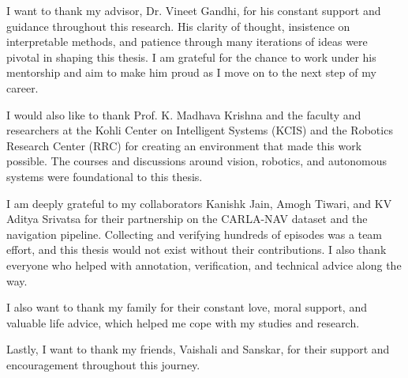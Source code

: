 I want to thank my advisor, Dr. Vineet Gandhi, for his constant support and guidance throughout this research. His clarity of thought, insistence on interpretable methods, and patience through many iterations of ideas were pivotal in shaping this thesis. I am grateful for the chance to work under his mentorship and aim to make him proud as I move on to the next step of my career.

I would also like to thank Prof. K. Madhava Krishna and the faculty and researchers at the Kohli Center on Intelligent Systems (KCIS) and the Robotics Research Center (RRC) for creating an environment that made this work possible. The courses and discussions around vision, robotics, and autonomous systems were foundational to this thesis.

I am deeply grateful to my collaborators Kanishk Jain, Amogh Tiwari, and KV Aditya Srivatsa for their partnership on the CARLA-NAV dataset and the navigation pipeline. Collecting and verifying hundreds of episodes was a team effort, and this thesis would not exist without their contributions. I also thank everyone who helped with annotation, verification, and technical advice along the way.

I also want to thank my family for their constant love, moral support, and valuable life advice, which helped me cope with my studies and research.

Lastly, I want to thank my friends, Vaishali and Sanskar, for their support and encouragement throughout this journey.

